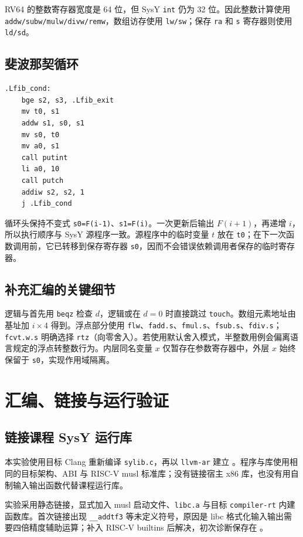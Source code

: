 \documentclass[UTF8,a4paper,10pt]{ctexart}
\begin{document}
RV64 的整数寄存器宽度是 64 位，但 SysY \texttt{int} 仍为 32 位。因此整数计算使用
\texttt{addw/subw/mulw/divw/remw}，数组访存使用 \texttt{lw/sw}；保存 \texttt{ra} 和 \texttt{s} 寄存器则使用 \texttt{ld/sd}。

\subsection{斐波那契循环}

\begin{lstlisting}[caption={手写斐波那契循环}]
.Lfib_cond:
    bge s2, s3, .Lfib_exit
    mv t0, s1
    addw s1, s0, s1
    mv s0, t0
    mv a0, s1
    call putint
    li a0, 10
    call putch
    addiw s2, s2, 1
    j .Lfib_cond
\end{lstlisting}

循环头保持不变式 \texttt{s0=F(i-1)}、\texttt{s1=F(i)}。一次更新后输出 $F(i+1)$，再递增 $i$，所以执行顺序与 SysY 源程序一致。源程序中的临时变量 $t$ 放在 \texttt{t0}；在下一次函数调用前，它已转移到保存寄存器 \texttt{s0}，因而不会错误依赖调用者保存的临时寄存器。

\subsection{补充汇编的关键细节}

逻辑与首先用 \texttt{beqz} 检查 $d$，逻辑或在 $d=0$ 时直接跳过 \texttt{touch}。数组元素地址由基址加 $i\times4$ 得到。浮点部分使用 \texttt{flw}、\texttt{fadd.s}、\texttt{fmul.s}、\texttt{fsub.s}、\texttt{fdiv.s}；\texttt{fcvt.w.s} 明确选择 \texttt{rtz}（向零舍入）。若使用默认舍入模式，半整数用例会偏离语言规定的浮点转整数行为。内层同名变量 $x$ 仅暂存在参数寄存器中，外层 $x$ 始终保留于 \texttt{s0}，实现作用域隔离。

\section{汇编、链接与运行验证}

\subsection{链接课程 SysY 运行库}

本实验使用目标 Clang 重新编译 \texttt{sylib.c}，再以 \texttt{llvm-ar} 建立 。程序与库使用相同的目标架构、ABI 与 RISC-V musl 标准库；没有链接宿主 x86 库，也没有用自制输入输出函数代替课程运行库。

实验采用静态链接，显式加入 musl 启动文件、\texttt{libc.a} 与目标 \texttt{compiler-rt} 内建函数库。首次链接出现 \texttt{\_\_addtf3} 等未定义符号，原因是 libc 格式化输入输出需要四倍精度辅助运算；补入 RISC-V builtins 后解决，初次诊断保存在 。
\end{document}
